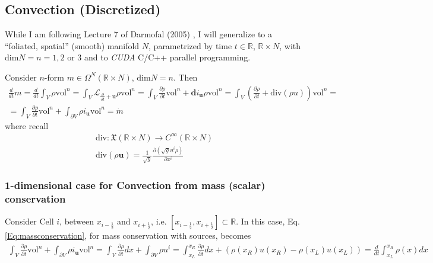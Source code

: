 \documentclass[10pt]{amsart}
\begin{document}
\begin{multicols*}{2}
\subsection{Convection (Discretized)}

While I am following Lecture 7 of Darmofal (2005) \cite{Darm2005}, I will generalize to a ``foliated, spatial'' (smooth) manifold $N$, parametrized by time $t\in \mathbb{R}$, $\mathbb{R}\times N$, with $\text{dim}N = n = 1,2 \text{ or } 3$ and to \emph{CUDA} C/C++ parallel programming.

Consider $n$-form $m \in \Omega^N(\mathbb{R}\times N)$, $\text{dim}N = n$.  Then
\begin{equation}\label{Eq:massconservation}
  \begin{gathered}
    \frac{d}{dt} m = \frac{d}{dt} \int_V \rho \text{vol}^n = \int_V \mathcal{L}_{\frac{ \partial }{ \partial t} + \mathbf{u} } \rho \text{vol}^n = \int_V \frac{ \partial \rho }{ \partial t} \text{vol}^n + \mathbf{d}i_{\mathbf{u}} \rho \text{vol}^n = \int_V \left( \frac{ \partial \rho }{ \partial t} + \text{div}( \rho u ) \right) \text{vol}^n = \\
    = \int_V \frac{ \partial \rho }{ \partial t} \text{vol}^n + \int_{\partial V} \rho i_{\mathbf{u}} \text{vol}^n = \dot{m}
\end{gathered}
  \end{equation}
where recall
\[
\begin{aligned}
  \text{div} : \mathfrak{X}(\mathbb{R}\times N) \to C^{\infty}(\mathbb{R} \times N ) \\ 
 \text{div}(\rho \mathbf{u} ) = \frac{1}{\sqrt{g}} \frac{ \partial ( \sqrt{g} u^i \rho ) }{ \partial x^i } 
  \end{aligned}
\]

\subsubsection{1-dimensional case for Convection from mass (scalar) conservation}

Consider Cell $i$, between $x_{i-\frac{1}{2} }$ and $ x_{i+\frac{1}{2} }$, i.e. $[x_{i-\frac{1}{2} }, x_{i+\frac{1}{2} }]\subset \mathbb{R}$.  In this case, Eq. \ref{Eq:massconservation}, for mass conservation with sources, becomes
\[
\begin{gathered}
  \int_V \frac{ \partial \rho}{ \partial t} \text{vol}^n + \int_{\partial V} \rho i_{\mathbf{u}} \text{vol}^n = \int_V \frac{ \partial \rho }{ \partial t} dx + \int_{\partial V} \rho u^i = \int_{x_L}^{x_R} \frac{ \partial \rho }{ \partial t} dx + (\rho(x_R)u(x_R) - \rho(x_L)u(x_L) ) = \frac{d}{dt} \int_{x_L}^{x_R} \rho(x) dx
  \end{gathered}
\]


\end{multicols*}
\end{document}
